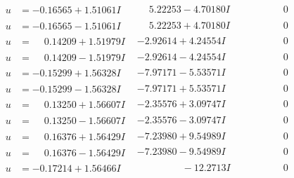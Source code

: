 \documentclass[1p]{elsarticle_modified}
\theoremstyle{definition}
\begin{document}
$$\begin{array}{c|c|c}
\begin{aligned}
u &= -0.16565 + 1.51061 I\end{aligned}
 & \phantom{-}5.22253 - 4.70180 I & \phantom{-0.000000 } 0 \\ \hline\begin{aligned}
u &= -0.16565 - 1.51061 I\end{aligned}
 & \phantom{-}5.22253 + 4.70180 I & \phantom{-0.000000 } 0 \\ \hline\begin{aligned}
u &= \phantom{-}0.14209 + 1.51979 I\end{aligned}
 & -2.92614 + 4.24554 I & \phantom{-0.000000 } 0 \\ \hline\begin{aligned}
u &= \phantom{-}0.14209 - 1.51979 I\end{aligned}
 & -2.92614 - 4.24554 I & \phantom{-0.000000 } 0 \\ \hline\begin{aligned}
u &= -0.15299 + 1.56328 I\end{aligned}
 & -7.97171 - 5.53571 I & \phantom{-0.000000 } 0 \\ \hline\begin{aligned}
u &= -0.15299 - 1.56328 I\end{aligned}
 & -7.97171 + 5.53571 I & \phantom{-0.000000 } 0 \\ \hline\begin{aligned}
u &= \phantom{-}0.13250 + 1.56607 I\end{aligned}
 & -2.35576 + 3.09747 I & \phantom{-0.000000 } 0 \\ \hline\begin{aligned}
u &= \phantom{-}0.13250 - 1.56607 I\end{aligned}
 & -2.35576 - 3.09747 I & \phantom{-0.000000 } 0 \\ \hline\begin{aligned}
u &= \phantom{-}0.16376 + 1.56429 I\end{aligned}
 & -7.23980 + 9.54989 I & \phantom{-0.000000 } 0 \\ \hline\begin{aligned}
u &= \phantom{-}0.16376 - 1.56429 I\end{aligned}
 & -7.23980 - 9.54989 I & \phantom{-0.000000 } 0 \\ \hline\begin{aligned}
u &= -0.17214 + 1.56466 I\end{aligned}
 & \phantom{-0.000000 } -12.2713 I & \phantom{-0.000000 } 0 \\ \hline\begin{aligned}

\end{aligned}
\end{array}$$
\end{document}
